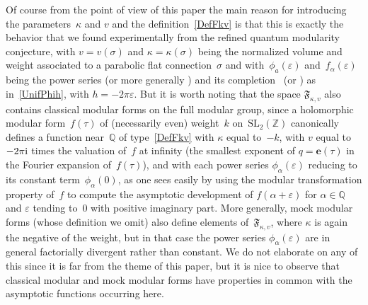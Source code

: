 \documentclass[pdftex]{sigma}
\numberwithin{equation}{section}
\def\k{\kappa}
\def\SL{\mathrm{SL}}
\def\Phih{\widehat\Phi}
\def\e{\mathbf{e}}
\def\a{\alpha}
\def\Z{\mathbb Z}
\def\Q{\mathbb Q}
\def\e{\mathbf{e}}
\def\a{\alpha}
\def\s{\sigma}
\def\v{\varepsilon}
\def\FF{\mathfrak F}
\begin{document}
Of course from the point of view of this paper the main reason for introducing the
parameters~$\k$ and $v$ and the definition~\eqref{DefFkv} is that this is exactly the
behavior that we found experimentally from the refined quantum modularity conjecture,
with $v=v(\s)$ and $\k=\k(\s)$ being the normalized volume and weight associated to
a parabolic flat connection~$\s$ and with~$\phi_a(\v)$ and~$f_\a(\v)$ being the power
series \smash{$\Phi_\a^{(K,\s)}(h)$} \big(or more generally \smash{$\Phi_\a^{(K,\s,\s')}(h)$}\big) and its
completion~\smash{$\Phih_\a^{(K,\s)}(h)$} \big(or \smash{$\Phih_\a^{(K,\s,\s')}(h)$}\big) as
in~\eqref{UnifPhih}, with $h=-2\pi\v$. But it is worth noting that the space
$\FF_{\k,v}$ also contains classical modular forms on the full modular group, since
a holomorphic modular form~$f(\tau)$ of (necessarily even) weight~$k$ on~$\SL_2(\Z)$
canonically defines a function near~$\Q$ of type~\eqref{DefFkv} with $\k$ equal
to~$-k$, with $v$ equal to $-2\pi {\rm i}$ times the valuation of~$f$ at infinity (the
smallest exponent of $q=\e(\tau)$ in the Fourier expansion of~$f(\tau)$), and with
each power series $\phi_\a(\v)$ reducing to its constant term~$\phi_\a(0)$, as one
sees easily by using
the modular transformation property of~$f$ to compute the asymptotic development
of $f(\a+\v)$ for $\a\in\Q$ and $\v$ tending to~0 with positive imaginary part. More
generally, mock modular forms (whose definition we omit) also define elements
of~$\FF_{\k,v}$, where $\k$ is again the negative of the weight, but in that case the
power series $\phi_\a(\v)$ are in general factorially divergent rather than constant.
We do not elaborate on any of this since it is far from the theme of this paper, but
it is nice to observe that classical modular and mock modular forms have properties
in common with the asymptotic functions occurring here.
\end{document}
